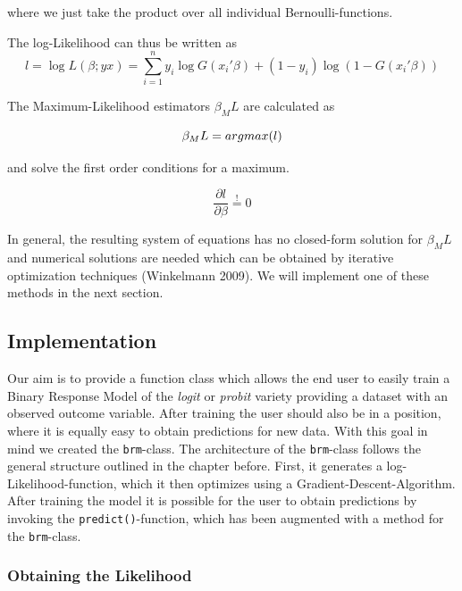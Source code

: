 \documentclass{article}
\begin{document}
where we just take the product over all individual Bernoulli-functions.

The log-Likelihood can thus be written as
\begin{equation}
\label{logL}
l = \log L(\beta;y x) = \sum_{i=1}^{n} y_i \log G(x_i\prime \beta) +(1-y_i) \log (1-G(x_i\prime \beta))
\end{equation}

The Maximum-Likelihood estimators $\beta_ML$ are calculated as

\begin{equation}
\beta_ML = argmax(l) \\
\end{equation}

and solve the first order conditions for a maximum.

\begin{equation}
\frac{\partial l}{\partial \beta} \stackrel{!}{=} 0
\end{equation}

In general, the resulting system of equations has no closed-form solution for $\beta_ML$ and numerical solutions are needed which can be obtained by iterative optimization techniques (Winkelmann 2009). We will implement one of these methods in the next section.

\subsection{Implementation}

Our aim is to provide a function class which allows the end user to easily train a Binary Response Model of the \textit{logit} or \textit{probit} variety providing a dataset with an observed outcome variable. After training the user should also be in a position, where it is equally easy to obtain predictions for new data. With this goal in mind we created the \texttt{brm}-class. The architecture of the \texttt{brm}-class follows the general structure outlined in the chapter before. First, it generates a log-Likelihood-function, which it then optimizes using a Gradient-Descent-Algorithm. After training the model it is possible for the user to  obtain predictions by invoking the \texttt{predict()}-function, which has been augmented with a method for the \texttt{brm}-class.

\subsubsection{Obtaining the Likelihood}
\end{document}
